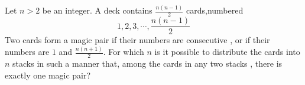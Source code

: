 Let $n>2$ be an integer. A deck contains $\frac{n(n-1)}{2}$ cards,numbered \[1,2,3,\cdots , \frac{n(n-1)}{2}\]Two cards form a magic pair if their numbers are consecutive , or if their numbers are $1$ and $\frac{n(n+1)}{2}$. For which $n$ is it possible to distribute the cards into $n$ stacks in such a manner that, among the cards in any two stacks , there is exactly one magic pair?